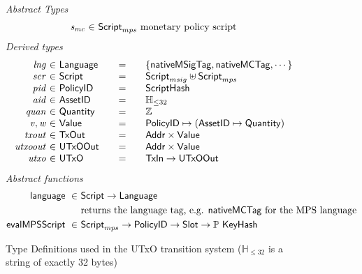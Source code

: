 
\begin{figure*}[t!]
  \emph{Abstract Types}
  \begin{equation*}
    \begin{array}{r@{~\in~}l@{~}lr}
      \var{s_{mc}} & \ScriptMPS & \text{monetary policy script}
     \end{array}
  \end{equation*}
  \emph{Derived types}
  \begin{equation*}
    \begin{array}{r@{~\in~}l@{\qquad=\qquad}lr}
      \var{lng} & \Language & \{\mathsf{nativeMSigTag}, \mathsf{nativeMCTag}, \cdots\} \\
      \var{scr} & \Script & \ScriptMSig \uniondistinct \ScriptMPS \\
      \var{pid} & \PolicyID & \ScriptHash \\
      \var{aid} & \AssetID & \mathbb{H}_{\leq 32}\\
      \var{quan} & \Quantity & \Z \\
      \var{v}, \var{w} & \Value
      & \PolicyID \mapsto ( \AssetID \mapsto \Quantity ) \\
      \var{txout}
      & \TxOut
      & \Addr \times \Value
      \\
      \var{utxoout}
      & \UTxOOut
      & \Addr \times \Value \\
      \var{utxo}
      & \UTxO
      & \TxIn \to \UTxOOut
    \end{array}
  \end{equation*}
  \emph{Abstract functions}
  \begin{align*}
    \mathsf{language} ~\in~    & \mathsf{Script} \to \mathsf{Language} \\
                            & \text{returns the language tag, e.g. $\mathsf{nativeMCTag}$ for the MPS language} \\
    \mathsf{evalMPSScript}~\in~& \mathsf{Script}_{mps}\to\mathsf{PolicyID}\to\mathsf{Slot}\to\mathbb{P}~\mathsf{KeyHash} \\
  \end{align*}

  \caption{Type Definitions used in the UTxO transition system ($\mathbb{H}_{\leq 32}$ is a string of exactly 32 bytes)}
  \label{fig:defs:utxo-shelley-1}
\end{figure*}

